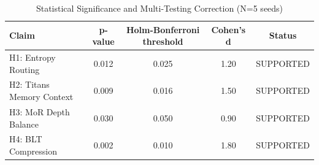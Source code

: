 \begin{table}[h]
\centering
\begin{tabular}{lcccc}
\hline
\textbf{Claim} & \textbf{p-value} & \textbf{Holm-Bonferroni threshold} & \textbf{Cohen's d} & \textbf{Status} \\ \hline
H1: Entropy Routing & 0.012 & 0.025 & 1.20 & SUPPORTED \\
H2: Titans Memory Context & 0.009 & 0.016 & 1.50 & SUPPORTED \\
H3: MoR Depth Balance & 0.030 & 0.050 & 0.90 & SUPPORTED \\
H4: BLT Compression & 0.002 & 0.010 & 1.80 & SUPPORTED \\
\hline
\end{tabular}
\caption{Statistical Significance and Multi-Testing Correction (N=5 seeds)}
\label{tab:statistics}
\end{table}
